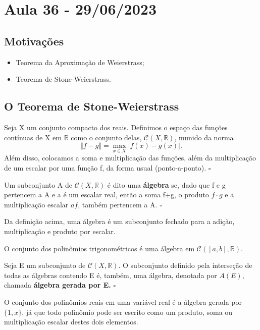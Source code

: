 \documentclass[../analysis_notes.tex]{subfiles}
\begin{document}
\section{Aula 36 - 29/06/2023}
\subsection{Motivações}
\begin{itemize}
	\item Teorema da Aproximação de Weierstrass;
	\item Teorema de Stone-Weierstrass.
\end{itemize}
\subsection{O Teorema de Stone-Weierstrass}
\begin{def*}
	Seja X um conjunto compacto dos reais. Definimos o espaço das funções contínuas de X em \(\mathbb{R}\) como o conjunto delas, \(\mathcal{C}(X, \mathbb{R})\), munido da norma
	\[
		\Vert f-g \Vert=\max_{x\in X}|f(x)-g(x)|.
	\]
	Além disso, colocamos a soma e multiplicação das funções, além da multiplicação de um escalar por uma função f, da forma usual (ponto-a-ponto). \(\square\)
\end{def*}
\begin{def*}
	Um subconjunto A de \(\mathcal{C}(X, \mathbb{R})\) é dito uma \textbf{álgebra} se, dado que f e g pertencem a A e a é um escalar real, então a soma f+g, o produto \(f \cdot g\) e a multiplicação escalar \(af\), também pertencem a A. \(\square\)
\end{def*}
Da definição acima, uma álgebra é um subconjunto fechado para a adição, multiplicação e produto por escalar.
\begin{example}
	O conjunto dos polinômios trigonométricos é uma álgebra em \(\mathcal{C}([a, b], \mathbb{R})\).
\end{example}
\begin{def*}
	Seja E um subconjunto de \(\mathcal{C}(X, \mathbb{R})\). O subconjunto definido pela interseção de todas as álgebras contendo E é, também, uma álgebra, denotada por \(A(E)\), chamada \textbf{álgebra gerada por E.} \(\square\)
\end{def*}
\begin{example}
	O conjunto dos polinômios reais em uma variável real é a álgebra gerada por \(\{1, x\}\), já que todo polinômio pode ser escrito como um produto, soma ou multiplicação escalar destes dois elementos.
\end{example}
\end{document}
